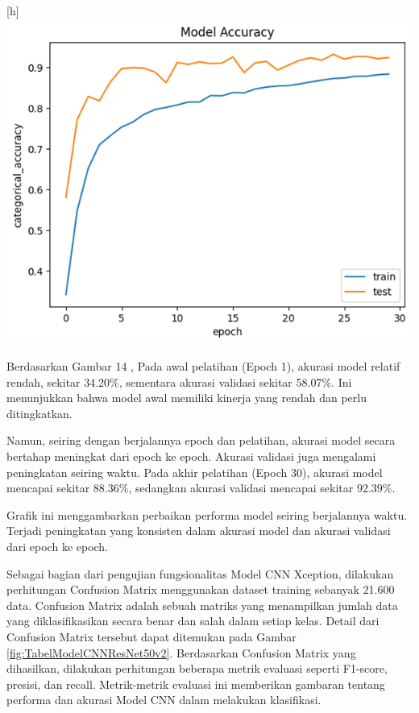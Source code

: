 \begin{center}[h]
	\includegraphics[width=0.7\linewidth]{gambar/bener/Accuracy_ModelXception.png}
	\label{fig:akurasiModelCNNXception}
\end{center}
Berdasarkan Gambar 14 , Pada awal pelatihan (Epoch 1), akurasi model relatif rendah, sekitar 34.20\%, sementara akurasi validasi sekitar 58.07\%. Ini menunjukkan bahwa model awal memiliki kinerja yang rendah dan perlu ditingkatkan.

Namun, seiring dengan berjalannya epoch dan pelatihan, akurasi model secara bertahap meningkat dari epoch ke epoch. Akurasi validasi juga mengalami peningkatan seiring waktu. Pada akhir pelatihan (Epoch 30), akurasi model mencapai sekitar 88.36\%, sedangkan akurasi validasi mencapai sekitar 92.39\%.

Grafik ini menggambarkan perbaikan performa model seiring berjalannya waktu. Terjadi peningkatan yang konsisten dalam akurasi model dan akurasi validasi dari epoch ke epoch.

Sebagai bagian dari pengujian fungsionalitas Model CNN Xception, dilakukan perhitungan Confusion Matrix menggunakan dataset training sebanyak 21.600 data. Confusion Matrix adalah sebuah matriks yang menampilkan jumlah data yang diklasifikasikan secara benar dan salah dalam setiap kelas. Detail dari Confusion Matrix tersebut dapat ditemukan pada Gambar \ref{fig:TabelModelCNNResNet50v2}. Berdasarkan Confusion Matrix yang dihasilkan, dilakukan perhitungan beberapa metrik evaluasi seperti F1-score, presisi, dan recall. Metrik-metrik evaluasi ini memberikan gambaran tentang performa dan akurasi Model CNN dalam melakukan klasifikasi.

